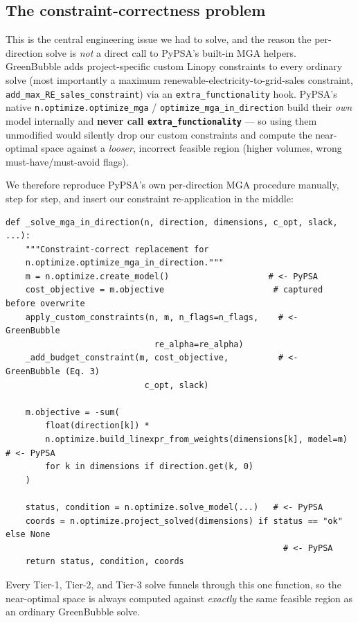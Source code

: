 \documentclass[11pt]{article}
\begin{document}
\subsection{The constraint-correctness problem}
\label{sec:constraint-problem}
This is the central engineering issue we had to solve, and the reason the
per-direction solve is \emph{not} a direct call to PyPSA's built-in MGA
helpers. GreenBubble adds project-specific custom Linopy constraints to
every ordinary solve (most importantly a maximum
renewable-electricity-to-grid-sales constraint,
\texttt{add\_max\_RE\_sales\_constraint}) via an \texttt{extra\_functionality}
hook. PyPSA's native \texttt{n.optimize.optimize\_mga} /
\texttt{optimize\_mga\_in\_direction} build their \emph{own} model
internally and \textbf{never call \texttt{extra\_functionality}} --- so
using them unmodified would silently drop our custom constraints and compute
the near-optimal space against a \emph{looser}, incorrect feasible region
(higher volumes, wrong must-have/must-avoid flags).

We therefore reproduce PyPSA's own per-direction MGA procedure manually,
step for step, and insert our constraint re-application in the middle:

\begin{lstlisting}
def _solve_mga_in_direction(n, direction, dimensions, c_opt, slack, ...):
    """Constraint-correct replacement for
    n.optimize.optimize_mga_in_direction."""
    m = n.optimize.create_model()                    # <- PyPSA
    cost_objective = m.objective                      # captured before overwrite
    apply_custom_constraints(n, m, n_flags=n_flags,    # <- GreenBubble
                              re_alpha=re_alpha)
    _add_budget_constraint(m, cost_objective,          # <- GreenBubble (Eq. 3)
                            c_opt, slack)

    m.objective = -sum(
        float(direction[k]) *
        n.optimize.build_linexpr_from_weights(dimensions[k], model=m)  # <- PyPSA
        for k in dimensions if direction.get(k, 0)
    )

    status, condition = n.optimize.solve_model(...)   # <- PyPSA
    coords = n.optimize.project_solved(dimensions) if status == "ok" else None
                                                        # <- PyPSA
    return status, condition, coords
\end{lstlisting}
Every Tier-1, Tier-2, and Tier-3 solve funnels through this one function, so
the near-optimal space is always computed against \emph{exactly} the same
feasible region as an ordinary GreenBubble solve.
\end{document}
